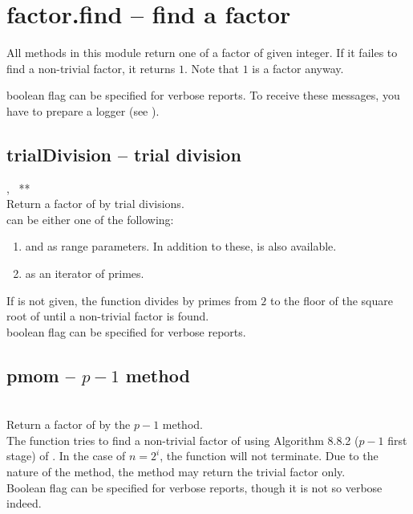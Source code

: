 

 \section{factor.find -- find a factor}
%
\quad All methods in this module return one of a factor of given integer.
If it failes to find a non-trivial factor, it returns \(1\).
Note that \(1\) is a factor anyway.

 boolean flag can be specified for verbose reports.
To receive these messages, you have to prepare a logger (see ).

  \subsection{trialDivision -- trial division}
   {%
     ,\ %
     **
   }{%
   }\\
   \spacing
   \quad Return a factor of  by trial divisions.\\
   \spacing
   \quad {} can be either one of the following:
   \begin{enumerate}
   \item {} and  as range parameters.
         In addition to these,  is also available.
   \item {} as an iterator of primes.
   \end{enumerate}
   If  is not given, the function divides  by primes from \(2\) to the floor of the square root of  until a non-trivial factor is found.\\
   \quad {} boolean flag can be specified for verbose reports.\\
%
  \subsection{pmom -- $p-1$ method}
   \\
   \spacing
   \quad Return a factor of  by the \(p-1\) method.\\
   \spacing
   \quad The function tries to find a non-trivial factor of 
   using Algorithm 8.8.2 (\(p-1\) first stage) of \cite{Cohen1}.
   In the case of \(n = 2^{i}\), the function will not terminate.
   Due to the nature of the method, the method may return the
   trivial factor only.\\
   \spacing
   \quad {} Boolean flag can be specified for verbose reports,
   though it is not so verbose indeed.\\
%
